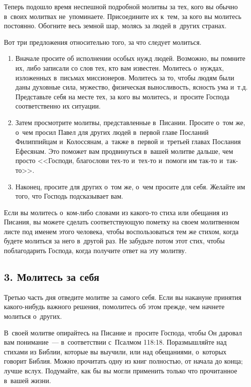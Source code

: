 \documentclass[12pt,article,a4paper,fittopage]{ncc}
\begin{document}
\begin{multicols}{2}
Теперь подошло время неспешной подробной молитвы за тех, кого вы обычно в~своих молитвах не~упоминаете. Присоедините их к~тем, за кого вы молитесь постоянно. Обогните весь земной шар, молясь за людей в~других странах.

Вот три предложения относительно того, за что следует молиться.
\begin{enumerate}
\item Вначале просите об исполнении особых нужд людей. Возможно, вы помните их, либо записали со слов тех, кто вам известен. Молитесь о~нуждах, изложенных в~письмах миссионеров. Молитесь за то, чтобы людям были даны духовные сила, мужество, физическая выносливость, ясность ума и~т.д. Представьте себя на месте тех, за кого вы молитесь, и~просите Господа соответственно их ситуации.

\item Затем просмотрите молитвы, представленные в~Писании. Просите о~том же, о~чем просил Павел для других людей в~первой главе Посланий Филиппийцам и~Колоссянам, а~также в~первой и~третьей главах Послания Ефесянам. Это поможет вам продвинуться в~вашей молитве дальше, чем просто <<Господи, благослови тех-то и~тех-то и~помоги им так-то и~так-то>>.

\item Наконец, просите для других о~том же, о~чем просите для себя. Желайте им того, что Господь подсказывает вам.
\end{enumerate}

\pagestyle{lheadings}

Если вы молитесь о~ком-либо словами из какого-то стиха или обещания из Писания, вы можете сделать соответствующую пометку на своем молитвенном листе под именем этого человека, чтобы воспользоваться тем же стихом, когда будете молиться за него в~другой раз. Не забудьте потом этот стих, чтобы поблагодарить Господа, когда получите ответ на эту молитву.

\subsection*{3. Молитесь за себя}

Третью часть дня отведите молитве за самого себя. Если вы накануне принятия какого-нибудь важного решения, помолитесь об этом прежде, чем начнете молиться о~других.

В~своей молитве опирайтесь на Писание и~просите Господа, чтобы Он даровал вам понимание~--- в~соответствии с~Псалмом 118:18. Поразмышляйте над стихами из Библии, которые вы выучили, или над обещаниями, о~которых говорит Библия. Можно прочитать одну из книг полностью, от начала до конца; лучше вслух. Подумайте, как бы вы могли применить только что прочитанное в~вашей жизни.


\end{multicols}
\end{document}
